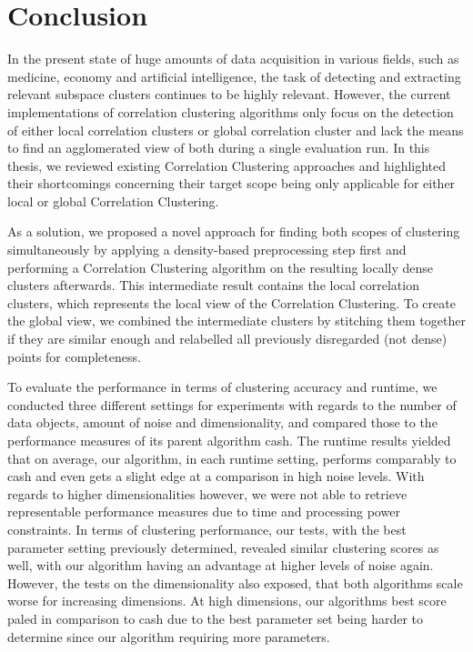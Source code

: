 \chapter{Conclusion}\label{ch:conclusion}
In the present state of huge amounts of data acquisition in various fields,  such as medicine, economy and artificial intelligence, the task of detecting and extracting relevant subspace clusters continues to be highly relevant. However, the current implementations of correlation clustering algorithms only focus on the detection of either local correlation clusters or global correlation cluster and lack the means to find an agglomerated view of both during a single evaluation run. In this thesis, we reviewed existing Correlation Clustering approaches and highlighted their shortcomings concerning their target scope being only applicable for either local or global Correlation Clustering. 

As a solution, we proposed a novel approach for finding both scopes of clustering simultaneously by applying a density-based preprocessing step first and performing a Correlation Clustering algorithm on the resulting locally dense clusters afterwards. This intermediate result contains the local correlation clusters, which represents the local view of the Correlation Clustering. To create the global view, we combined the intermediate clusters by stitching them together if they are similar enough and relabelled all previously disregarded (not dense) points for completeness.

To evaluate the performance in terms of clustering accuracy and runtime, we conducted three different settings for experiments with regards to the number of data objects, amount of noise and dimensionality, and compared those to the performance measures of its parent algorithm \gls{cash}. 
The runtime results yielded that on average, our algorithm, in each runtime setting, performs comparably to \gls{cash} and even gets a slight edge at a comparison in high noise levels. With regards to higher dimensionalities however, we were not able to retrieve representable performance measures due to time and processing power constraints. In terms of clustering performance, our tests, with the best parameter setting previously determined, revealed similar clustering scores as well, with our algorithm having an advantage at higher levels of noise again. However, the tests on the dimensionality also exposed, that both algorithms scale worse for increasing dimensions. At high dimensions, our algorithms best score paled in comparison to \gls{cash} due to the best parameter set being harder to determine since our algorithm requiring more parameters.


